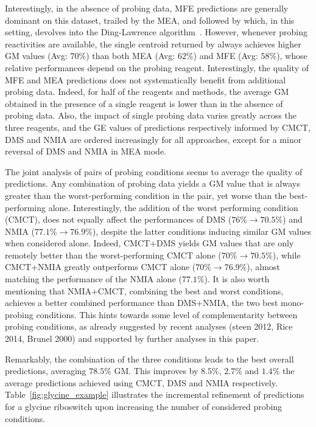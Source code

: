\documentclass[a4,center,fleqn]{NAR}
\begin{document}
Interestingly, in the absence of probing data, MFE predictions are generally dominant on this dataset, trailed by the MEA, and followed by \OurTool which, in this setting, devolves into the Ding-Lawrence algorithm~\citep{Ding2003}. However, whenever probing reactivities are available, the single centroid returned by \OurTool always achieves higher GM values (Avg: $70\%$) than both MEA (Avg: $62\%$) and MFE  (Avg: $58\%$), whose relative performances depend on the probing reagent.%
Interestingly, the quality of MFE and MEA predictions does not systematically benefit from additional probing data. Indeed, for half of the reagents and methods, the average GM obtained in the presence of a single reagent is lower than in the absence of probing data. Also, the impact of single probing data varies greatly across the three reagents, and the GE values of predictions respectively informed by CMCT, DMS and NMIA are ordered increasingly for all approaches, except for a minor reversal of DMS and NMIA in MEA mode.



The joint analysis of pairs of probing conditions seems to average the quality of predictions. Any combination of probing data yields a GM value that is always greater than the worst-performing condition in the pair, yet worse than the best-performing alone. Interestingly, the addition of the worst performing condition (CMCT), does not equally affect the performances of DMS ($76\% \to 70.5\%$) %
and NMIA  ($77.1\% \to 76.9\%$), %
despite the latter conditions inducing similar GM values when considered alone. Indeed, CMCT+DMS yields GM values that are only remotely better than the worst-performing CMCT alone  ($70\% \to 70.5\%$), while CMCT+NMIA greatly outperforms CMCT alone  ($70\% \to 76.9\%$), almost matching the performance of the NMIA alone ($77.1\%$). It is also worth mentioning that NMIA+CMCT, combining the best and worst conditions, achieves a better combined performance than DMS+NMIA, the two best mono-probing conditions. This hints towards some level of complementarity between probing conditions, as already suggested by recent analyses \citep{Yu2018} (steen 2012, Rice 2014, Brunel 2000) and supported by further analyses in this paper.

Remarkably, the combination of the three conditions leads to the best overall predictions, averaging $78.5\%$ GM.
This improves by $8.5\%$, $2.7\%$ and $1.4\%$ the average predictions achieved using CMCT, DMS and NMIA respectively.
Table~\ref{fig:glycine_example} illustrates the incremental refinement of \OurTool predictions for a glycine riboswitch upon increasing the number of considered probing conditions.
 
\end{document}
